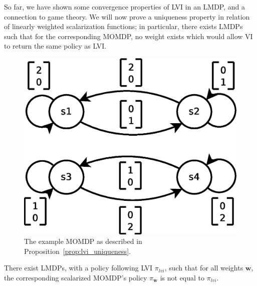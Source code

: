 So far, we have shown some convergence properties of LVI in an LMDP, and a connection to game theory. We will now prove a uniqueness property in relation of linearly weighted scalarization functions; in particular, there exists LMDPs such that for the corresponding MOMDP, no weight exists which would allow VI to return the same policy as LVI.

\begin{figure}%
\begin{center}
    \includegraphics[width=0.75\linewidth]{momdp.eps}
    \caption{The example MOMDP as described in Proposition~\ref{prop:lvi_uniqueness}.}
    \label{fig:example_momdp}
\end{center}
\end{figure}

\begin{proposition}
    \label{prop:lvi_uniqueness}
    There exist LMDPs, with a policy following LVI $\pi_{lvi}$, such that for all weights $\mathbf{w}$, the corresponding scalarized MOMDP's policy $\pi_{\mathbf{w}}$ is not equal to $\pi_{lvi}$.
\end{proposition}

